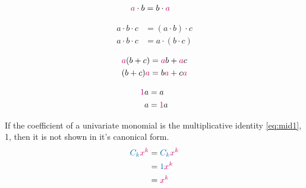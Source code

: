 \documentclass[20150903-160354-rs2.2-MarksMathNotebook.tex]{subfiles}
\begin{document}
\begin{definition}
\begin{align}
\alert{a} \cdot b &= b \cdot \alert{a} \label{eq:cpm}
\end{align}
\end{definition}

\begin{definition}
\begin{subequations}
\begin{align}
a\cdot b\cdot c &= (a\cdot b)\cdot c \label{eq:apm1} \\
a\cdot b\cdot c &= a\cdot (b\cdot c) \label{eq:apm2}
\end{align}
\end{subequations}
\end{definition}

\begin{definition}
\begin{subequations}
\begin{align}
\alert{a}(b+c) &= \alert{a}b + \alert{a}c \label{eq:dpe1} \\
 (b+c)\alert{a} &= b\alert{a} + c\alert{a}  \label{eq:dpe2}
\end{align}
\end{subequations}
\end{definition}

\begin{definition}
\begin{subequations}
\begin{align}
\alert{1}a &= a \label{eq:mid1} \\
a &= \alert{1}a \label{eq:mid2}
\end{align}
\end{subequations}
\end{definition}

\begin{remark}
If the coefficient of a univariate monomial is the multiplicative identity \ref{eq:mid1}, 1, then it is not shown in it's canonical form.
\begin{align*}
 \cBlue{C_{k}}\cRed{x^{k}}	& = \cBlue{C_{k}} \cRed{x^{k}} \\
 							& = \cBlue{1} \cRed{x^{k}} \\
                            & = \cRed{x^{k}}
\end{align*}
\end{remark}
\end{document}

